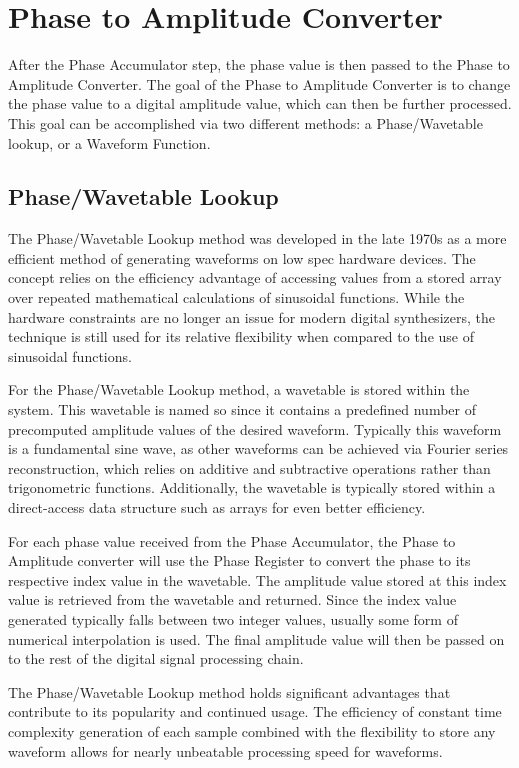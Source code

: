 \documentclass[a4paper,12pt]{report}
\begin{document}
\section{Phase to Amplitude Converter}
\label{sec:phasetoamplitudeconverter}
After the Phase Accumulator step, the phase value is then passed to the Phase to Amplitude Converter. The goal of the Phase to Amplitude Converter is to change the phase value to a digital amplitude value, which can then be further processed. This goal can be accomplished via two different methods: a Phase/Wavetable lookup, or a Waveform Function.

\subsection{Phase/Wavetable Lookup}
\label{subsec:phasewavetablelookup}
The Phase/Wavetable Lookup method was developed in the late 1970s as a more efficient method of generating waveforms on low spec hardware devices. The concept relies on the efficiency advantage of accessing values from a stored array over repeated mathematical calculations of sinusoidal functions. While the hardware constraints are no longer an issue for modern digital synthesizers, the technique is still used for its relative flexibility when compared to the use of sinusoidal functions.

For the Phase/Wavetable Lookup method, a wavetable is stored within the system. This wavetable is named so since it contains a predefined number of precomputed amplitude values of the desired waveform. Typically this waveform is a fundamental sine wave, as other waveforms can be achieved via Fourier series reconstruction, which relies on additive and subtractive operations rather than trigonometric functions. Additionally, the wavetable is typically stored within a direct-access data structure such as arrays for even better efficiency.


For each phase value received from the Phase Accumulator, the Phase to Amplitude converter will use the Phase Register to convert the phase to its respective index value in the wavetable. The amplitude value stored at this index value is retrieved from the wavetable and returned. Since the index value generated typically falls between two integer values, usually some form of numerical interpolation is used. The final amplitude value will then be passed on to the rest of the digital signal processing chain.

The Phase/Wavetable Lookup method holds significant advantages that contribute to its popularity and continued usage. The efficiency of constant time complexity generation of each sample combined with the flexibility to store any waveform allows for nearly unbeatable processing speed for waveforms.
\end{document}
